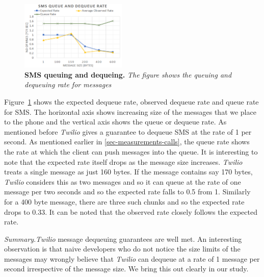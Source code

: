 \begin{figure} \centering
\includegraphics[width=0.45\textwidth]{graphs/sms.pdf}
\caption{\textbf{SMS queuing and dequeing.} {\footnotesize\textit{
The figure shows the queuing and dequeuing rate for messages
}}}
\label{fig:sms}
\end{figure}

Figure~\ref{fig:sms} shows the expected dequeue rate, observed dequeue rate and queue rate for SMS. The horizontal axis shows increasing size of the messages that we place to the phone and the vertical axis shows the queue or dequeue rate. As mentioned before \textit{Twilio} gives a guarantee to dequeue SMS at the rate of 1 per second. As mentioned earlier in \ref{sec-measurements-calls}, the queue rate shows the rate at which the client can push messages into the queue. It is interesting to note that the expected rate itself drops as the message size increases. \textit{Twilio} treats a single message as just 160 bytes. If the message contains say 170 bytes, \textit{Twilio} considers this as two messages and so it can queue at the rate of one message per two seconds and so the expected rate falls to 0.5 from 1. Similarly for a 400 byte message, there are three such chunks and so the expected rate drops to 0.33. It can be noted that the observed rate closely follows the expected rate. 

\textit{Summary}.\textit{Twilio} message dequeuing guarantees are well met. An interesting observation is that naive developers who do not notice the size limits of the messages may wrongly believe that \textit{Twilio} can dequeue at a rate of 1 message per second irrespective of the message size. We bring this out clearly in our study. 


